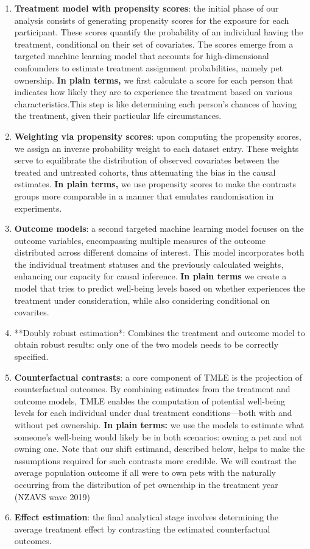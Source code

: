 \documentclass[
  singlecolumn]{article}
\begin{document}
\begin{enumerate}
\def\labelenumi{\arabic{enumi}.}
\item
  \textbf{Treatment model with propensity scores}: the initial phase of
  our analysis consists of generating propensity scores for the exposure
  for each participant. These scores quantify the probability of an
  individual having the treatment, conditional on their set of
  covariates. The scores emerge from a targeted machine learning model
  that accounts for high-dimensional confounders to estimate treatment
  assignment probabilities, namely pet ownership. \textbf{In plain
  terms,} we first calculate a score for each person that indicates how
  likely they are to experience the treatment based on various
  characteristics.This step is like determining each person's chances of
  having the treatment, given their particular life circumstances.
\item
  \textbf{Weighting via propensity scores}: upon computing the
  propensity scores, we assign an inverse probability weight to each
  dataset entry. These weights serve to equilibrate the distribution of
  observed covariates between the treated and untreated cohorts, thus
  attenuating the bias in the causal estimates. \textbf{In plain terms,}
  we use propensity scores to make the contrasts groups more comparable
  in a manner that emulates randomisation in experiments.
\item
  \textbf{Outcome models}: a second targeted machine learning model
  focuses on the outcome variables, encompassing multiple measures of
  the outcome distributed across different domains of interest. This
  model incorporates both the individual treatment statuses and the
  previously calculated weights, enhancing our capacity for causal
  inference. \textbf{In plain terms} we create a model that tries to
  predict well-being levels based on whether experiences the treatment
  under consideration, while also considering conditional on covarites.
\item
  **Doubly robust estimation*: Combines the treatment and outcome model
  to obtain robust results: only one of the two models needs to be
  correctly specified.
\item
  \textbf{Counterfactual contrasts}: a core component of TMLE is the
  projection of counterfactual outcomes. By combining estimates from the
  treatment and outcome models, TMLE enables the computation of
  potential well-being levels for each individual under dual treatment
  conditions---both with and without pet ownership. \textbf{In plain
  terms:} we use the models to estimate what someone's well-being would
  likely be in both scenarios: owning a pet and not owning one. Note
  that our shift estimand, described below, helps to make the
  assumptions required for such contrasts more credible. We will
  contrast the average population outcome if all were to own pets with
  the naturally occurring from the distribution of pet ownership in the
  treatment year (NZAVS wave 2019)
\item
  \textbf{Effect estimation}: the final analytical stage involves
  determining the average treatment effect by contrasting the estimated
  counterfactual outcomes.
\end{enumerate}
\end{document}

